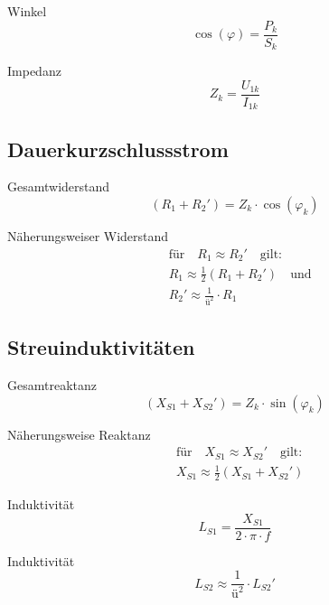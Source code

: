 \documentclass[11pt, a4paper, draft, fleqn, twocolumn]{article}
\numberwithin{equation}{subsection}
\begin{document}
\noindent Winkel
\begin{equation}
    \cos(\varphi) = \frac{P_k}{S_k}
\end{equation}

\noindent Impedanz
\begin{equation}
    Z_k = \frac{U_{1k}}{I_{1k}}
\end{equation}


\subsection{Dauerkurzschlussstrom}

Gesamtwiderstand
\begin{equation}
    (R_1 + R_2') = Z_k \cdot \cos(\varphi_k)
\end{equation}

\noindent Näherungsweiser Widerstand
\begin{equation}
\begin{split}
    & \text{für} \quad R_1 \approx R_2' \quad \text{gilt:} \\
    & R_1 \approx \frac{1}{2}(R_1 + R_2') \quad \text{und} \\
    & R_2' \approx \frac{1}{\text{ü}^2}\cdot R_1
\end{split}
\end{equation}


\subsection{Streuinduktivitäten}

Gesamtreaktanz
\begin{equation}
    (X_{S1} + X_{S2}') = Z_k \cdot \sin(\varphi_k)
\end{equation}

\noindent Näherungsweise Reaktanz
\begin{equation}
\begin{split}
    & \text{für} \quad X_{S1} \approx X_{S2}' \quad \text{gilt:} \\
    & X_{S1} \approx \frac{1}{2}(X_{S1} + X_{S2}')
\end{split}
\end{equation}

\noindent Induktivität
\begin{equation}
    L_{S1} = \frac{X_{S1}}{2 \cdot \pi \cdot f}
\end{equation}

\noindent Induktivität
\begin{equation}
    L_{S2} \approx \frac{1}{\text{ü}^2} \cdot L_{S2}'
\end{equation}
\end{document}
